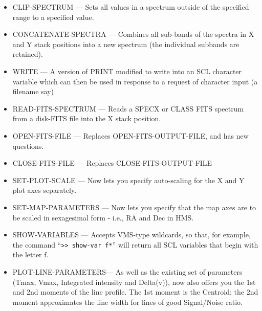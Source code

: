 \documentclass[twoside,11pt]{article}
\renewcommand{\_}{\texttt{\symbol{95}}}
\begin{document}
\begin{itemize}
\item CLIP-SPECTRUM       --- Sets all values in a spectrum outside of the specified
                        range to a specified value.

\item CONCATENATE-SPECTRA --- Combines all sub-bands of the spectra in X and Y stack
                        positions into a new spectrum (the individual subbands
                        are retained).

\item WRITE               --- A version of PRINT modified to write into an SCL
                        character variable which can then be used in response
                        to a request of character input (a filename say)

\item READ-FITS-SPECTRUM  --- Reads a SPECX or CLASS FITS spectrum from a disk-FITS
                        file into the X stack position.

\item OPEN-FITS-FILE      --- Replaces OPEN-FITS-OUTPUT-FILE, and has new questions.

\item CLOSE-FITS-FILE     --- Replaces CLOSE-FITS-OUTPUT-FILE

\item SET-PLOT-SCALE      --- Now lets you specify auto-scaling for the X and Y
                        plot axes separately.

\item SET-MAP-PARAMETERS  --- Now lets you specify that the map axes are to be
                        scaled in sexagesimal form - i.e., RA and Dec in HMS.

\item SHOW-VARIABLES      --- Accepts VMS-type wildcards, so that, for example, the
                        command ``\verb+>> show-var f*+'' will return all SCL variables
                        that begin with the letter f.

\item PLOT-LINE-PARAMETERS--- As well as the existing set of parameters (Tmax, Vmax,
                        Integrated intensity and Delta(v)), now also offers you
                        the 1st and 2nd moments of the line profile. The 1st
                        moment is the Centroid; the 2nd moment approximates the
                        line width for lines of good Signal/Noise ratio.
\end{itemize}
\end{document}
